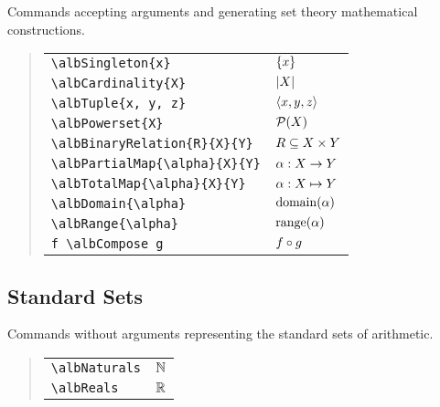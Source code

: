 \documentclass[11pt,a4paper,oneside]{alb-corp}
\begin{document}
Commands accepting arguments and generating set theory mathematical
constructions.

\begin{quote}
  \begin{tabular}{p{}@{\qquad}p{}}
    \verb$\albSingleton{x}$ & $\left\{ x \right\}$ \\
    \verb$\albCardinality{X}$ & $\left| X \right|$ \\
    \verb$\albTuple{x, y, z}$ & $\albTuple{x, y, z}$ \\
    \verb$\albPowerset{X}$ & $\mathcal{P}(X)$ \\
    \verb$\albBinaryRelation{R}{X}{Y}$ & $\albBinaryRelation{R}{X}{Y}$ \\
    \verb$\albPartialMap{\alpha}{X}{Y}$ %
    & $\albPartialMap{\alpha}{X}{Y}$ \\
    \verb$\albTotalMap{\alpha}{X}{Y}$ %
    & $\albTotalMap{\alpha}{X}{Y}$ \\
    \verb$\albDomain{\alpha}$ & $\operatorname{domain}(\alpha)$ \\
    \verb$\albRange{\alpha}$ & $\operatorname{range}(\alpha)$ \\
    \verb$f \albCompose g$ & $f \circ g$
  \end{tabular}
\end{quote}



\subsection{Standard Sets}
\label{sec:alb-order-theory-documentation:stand-sets}

Commands without arguments representing the standard sets of arithmetic.

\begin{quote}
  \begin{tabular}{p{}@{\qquad}p{}}
    \verb$\albNaturals$ & $\albNaturals$ \\
    \verb$\albReals$ & $\albReals$
  \end{tabular}
\end{quote}
\end{document}
